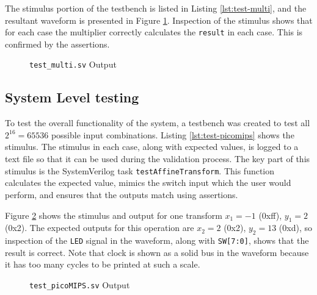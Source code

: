 The stimulus portion of the testbench is listed in Listing \ref{lst:test-multi}, and the resultant waveform is presented in Figure \ref{fig:test-multi}. Inspection of the stimulus shows that for each case the multiplier correctly calculates the \texttt{result} in each case. This is confirmed by the assertions.

\FloatBarrier %


\begin{figure}[ht]
	\centering
	
	\caption{\texttt{test\_multi.sv} Output}
	\label{fig:test-multi}
\end{figure}

\subsection{System Level testing} \label{sec:sys-level-testing}

To test the overall functionality of the system, a testbench was created to test all $2^{16} = 65536$ possible input combinations. Listing \ref{lst:test-picomips} shows the stimulus. The stimulus in each case, along with expected values, is logged to a text file so that it can be used during the validation process. The key part of this stimulus is the SystemVerilog task \texttt{testAffineTransform}. This function calculates the expected value, mimics the switch input which the user would perform, and ensures that the outputs match using assertions.

Figure \ref{fig:test-picomips} shows the stimulus and output for one transform $x_1 = -1$ (0xff), $y_1 = 2$ (0x2). The expected outputs for this operation are $x_2 = 2$ (0x2), $y_2 = 13$ (0xd), so inspection of the \texttt{LED} signal in the waveform, along with \texttt{SW[7:0]}, shows that the result is correct. Note that clock is shown as a solid bus in the waveform because it has too many cycles to be printed at such a scale.



\begin{figure}[ht]
	\centering
	
	\caption{\texttt{test\_picoMIPS.sv} Output}
	\label{fig:test-picomips}
\end{figure}


